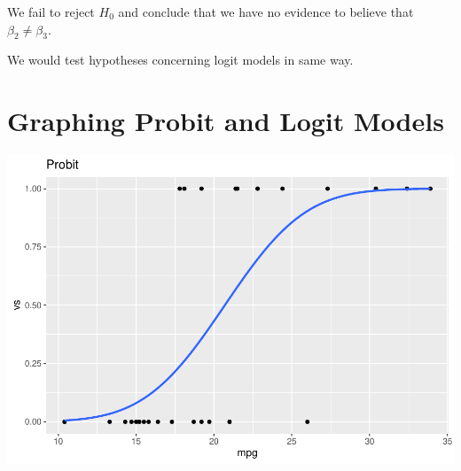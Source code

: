 \documentclass[]{book}
\newenvironment{Shaded}{\begin{snugshade}}{\end{snugshade}}
\newcommand{\DataTypeTok}[1]{\textcolor[rgb]{0.13,0.29,0.53}{#1}}
\newcommand{\KeywordTok}[1]{\textcolor[rgb]{0.13,0.29,0.53}{\textbf{#1}}}
\newcommand{\NormalTok}[1]{#1}
\newcommand{\OperatorTok}[1]{\textcolor[rgb]{0.81,0.36,0.00}{\textbf{#1}}}
\newcommand{\StringTok}[1]{\textcolor[rgb]{0.31,0.60,0.02}{#1}}
\begin{document}
We fail to reject \(H_0\) and conclude that we have no evidence to believe that \(\beta_2\ne\beta_3\).

We would test hypotheses concerning logit models in same way.

\hypertarget{graphing-probit-and-logit-models}{%
\section{Graphing Probit and Logit Models}\label{graphing-probit-and-logit-models}}

\begin{Shaded}
\end{Shaded}

\includegraphics{bailey_files/figure-latex/unnamed-chunk-140-1.pdf}
\end{document}
